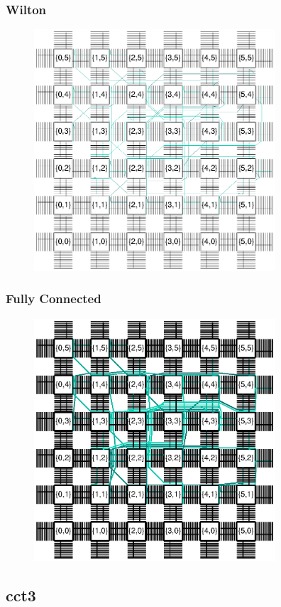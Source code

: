 \documentclass[11pt]{article}
\begin{document}
\subsubsection{Wilton}
\begin{figure}[H]
\centering
\includegraphics[clip, viewport=165 248 461 544, width=9cm]{assets/wilton-cct2-as-is}
\end{figure}

\subsubsection{Fully Connected}
\begin{figure}[H]
\centering
\includegraphics[clip, viewport=159 248 455 544, width=9cm]{assets/fc-cct2-as-is}
\end{figure}

\subsection{cct3}
\end{document}
